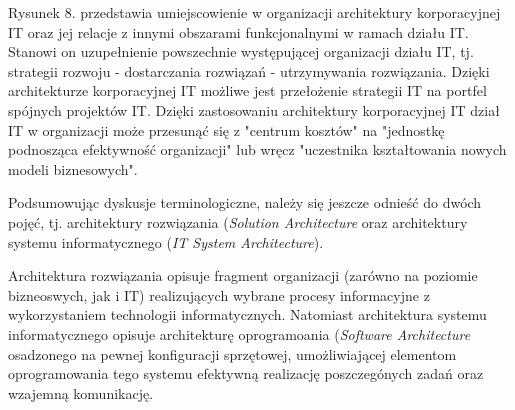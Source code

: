 Rysunek 8. przedstawia umiejscowienie w organizacji architektury korporacyjnej IT oraz jej relacje z innymi obszarami funkcjonalnymi w ramach działu IT. Stanowi on uzupełnienie powszechnie występującej organizacji działu IT, tj. strategii rozwoju - dostarczania rozwiązań - utrzymywania rozwiązania. Dzięki architekturze korporacyjnej IT możliwe jest przełożenie strategii IT na portfel spójnych projektów IT. Dzięki zastosowaniu architektury korporacyjnej IT dział IT w organizacji może przesunąć się z "centrum kosztów" na "jednostkę podnosząca efektywność organizacji" lub wręcz "uczestnika kształtowania nowych modeli biznesowych".

Podsumowując dyskusje terminologiczne, należy się jeszcze odnieść do dwóch pojęć, tj. architektury rozwiązania (\textit{Solution Architecture} oraz architektury systemu informatycznego (\textit{IT System Architecture}). 

Architektura rozwiązania opisuje fragment organizacji (zarówno na poziomie bizneoswych, jak i IT) realizujących wybrane procesy informacyjne z wykorzystaniem technologii informatycznych. Natomiast architektura systemu informatycznego opisuje architekturę oprogramoania (\textit{Software Architecture} osadzonego na pewnej konfiguracji sprzętowej, umożliwiającej elementom oprogramowania tego systemu efektywną realizację poszczegónych zadań oraz wzajemną komunikację. 

